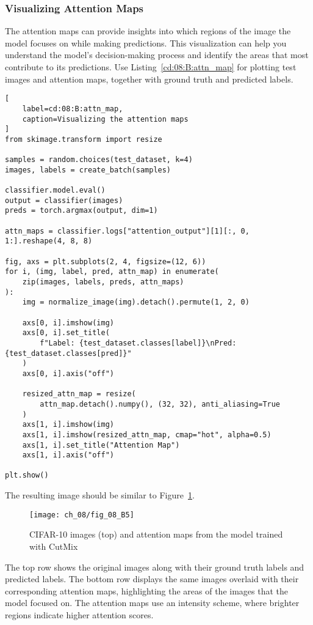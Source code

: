 \subsubsection{Visualizing Attention Maps}

The attention maps can provide insights into which regions of the image the model focuses on while making predictions. This visualization can help you understand the model's decision-making process and identify the areas that most contribute to its predictions.
Use Listing~\ref{cd:08:B:attn_map} for plotting test images and attention maps, together with ground truth and predicted labels.
\begin{lstlisting}[
    label=cd:08:B:attn_map,
    caption=Visualizing the attention maps
]
from skimage.transform import resize

samples = random.choices(test_dataset, k=4)
images, labels = create_batch(samples)

classifier.model.eval()
output = classifier(images)
preds = torch.argmax(output, dim=1)

attn_maps = classifier.logs["attention_output"][1][:, 0, 1:].reshape(4, 8, 8)

fig, axs = plt.subplots(2, 4, figsize=(12, 6))
for i, (img, label, pred, attn_map) in enumerate(
    zip(images, labels, preds, attn_maps)
):
    img = normalize_image(img).detach().permute(1, 2, 0)

    axs[0, i].imshow(img)
    axs[0, i].set_title(
        f"Label: {test_dataset.classes[label]}\nPred: {test_dataset.classes[pred]}"
    )
    axs[0, i].axis("off")

    resized_attn_map = resize(
        attn_map.detach().numpy(), (32, 32), anti_aliasing=True
    )
    axs[1, i].imshow(img)
    axs[1, i].imshow(resized_attn_map, cmap="hot", alpha=0.5)
    axs[1, i].set_title("Attention Map")
    axs[1, i].axis("off")

plt.show()
\end{lstlisting}

The resulting image should be similar to Figure~\ref{fig:08:B:5}.

\begin{figure}[H]
    \texttt{[image: ch\_08/fig\_08\_B5]}
    \caption{CIFAR-10 images (top) and attention maps from the model trained with CutMix}
    \label{fig:08:B:5}
\end{figure}

The top row shows the original images along with their ground truth labels and predicted labels. The bottom row displays the same images overlaid with their corresponding attention maps, highlighting the areas of the images that the model focused on. The attention maps use an intensity scheme, where brighter regions indicate higher attention scores. 

